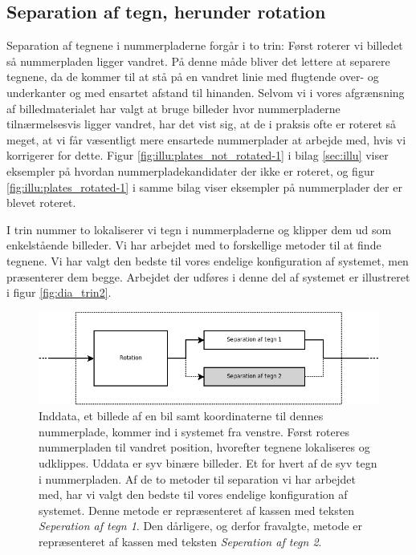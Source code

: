 \subsection{Separation af tegn, herunder rotation}
Separation af tegnene i nummerpladerne forgår i to trin: Først roterer vi billedet så nummerpladen ligger vandret. På denne måde bliver det lettere at separere tegnene, da de kommer til at stå på en vandret linie med flugtende over- og underkanter og med ensartet afstand til hinanden. Selvom vi i vores afgrænsning af billedmaterialet har valgt at bruge billeder hvor nummerpladerne tilnærmelsesvis ligger vandret, har det vist sig, at de i praksis ofte er roteret så meget, at vi får væsentligt mere ensartede nummerplader at arbejde med, hvis vi korrigerer for dette. Figur \vref{fig:illu:plates_not_rotated-1} i bilag \ref{sec:illu} viser eksempler på hvordan nummerpladekandidater der ikke er roteret, og figur \ref{fig:illu:plates_rotated-1} i samme bilag viser eksempler på nummerplader der er blevet roteret.

I trin nummer to lokaliserer vi tegn i nummerpladerne og klipper dem ud som enkelstående billeder. Vi har arbejdet med to forskellige metoder til at finde tegnene. Vi har valgt den bedste til vores endelige konfiguration af systemet, men præsenterer dem begge. Arbejdet der udføres i denne del af systemet er illustreret i figur \vref{fig:dia_trin2}.


\begin{figure}[htp]
\centering
\includegraphics[width=12cm]{system/illu/dia_trin2.png} 
\caption{Inddata, et billede af en bil samt koordinaterne til dennes nummerplade, kommer ind i systemet fra venstre. Først roteres nummerpladen til vandret position, hvorefter tegnene lokaliseres og udklippes. Uddata er syv binære billeder. Et for hvert af de syv tegn i nummerpladen. Af de to metoder til separation vi har arbejdet med, har vi valgt den bedste til vores endelige konfiguration af systemet. Denne metode er repræsenteret af kassen med teksten \textit{Seperation af tegn 1}. Den dårligere, og derfor fravalgte, metode er repræsenteret af kassen med teksten \textit{Seperation af tegn 2}.}
\label{fig:dia_trin2}
\end{figure}


